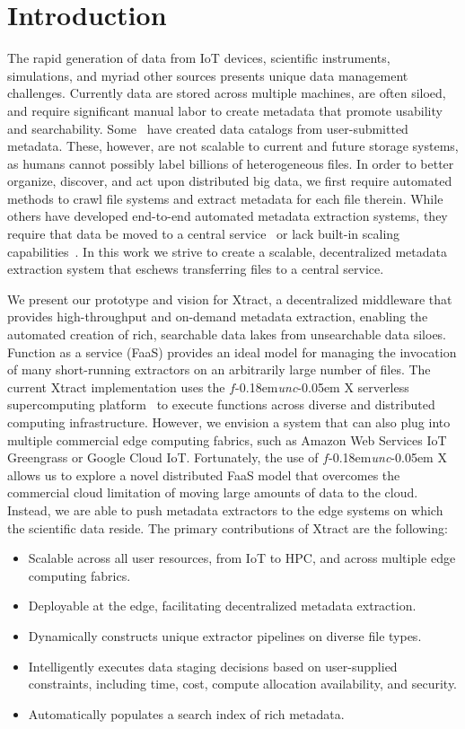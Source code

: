 \documentclass[sigconf, 9pt]{acmart}
\newcommand{\name}{Xtract}
\newcommand{\funcx}{$f$\kern-0.18em\emph{unc}\kern-0.05em X}
\begin{document}
\section{Introduction}

The rapid generation of data from IoT devices, scientific instruments, simulations, and myriad other sources presents unique 
data management challenges. Currently data are stored across multiple machines, are often siloed, and require 
significant manual labor to create metadata that promote usability and searchability. 
Some~\cite{egan2003vizier, dataverse}  have created data catalogs from user-submitted metadata. These, however, are not scalable to current and future storage systems,
as humans cannot possibly label billions of heterogeneous files.   
In order to better organize, discover, and act upon distributed big data, 
we first require automated methods to crawl file systems and extract 
metadata for each file therein. 
While others have developed end-to-end automated metadata extraction systems, 
they require that data be moved to a central service~\cite{skluzacek2018skluma, skluzacek2016klimatic, padhy2015brown, rodrigo2018sciencesearch} or lack built-in scaling capabilities~\cite{mattmann2011tika}. 
In this work we strive to create a scalable, decentralized metadata extraction system that eschews transferring files to a central service.

We present our prototype and vision for \name{},
a decentralized middleware that provides high-throughput and on-demand metadata 
extraction, enabling the automated creation of rich, searchable data lakes from unsearchable data siloes. 
Function as a service (FaaS)
provides an ideal model for managing the invocation of
many short-running extractors on an arbitrarily large number of files. 
The current \name{} implementation uses the \funcx{} serverless supercomputing platform~\cite{chard2019serverless}
to execute functions across diverse and distributed computing infrastructure.  However, we envision a system that can 
also plug into multiple commercial edge computing fabrics, such as Amazon Web Services IoT Greengrass or Google Cloud IoT. 
Fortunately, the use of \funcx{} allows us to explore a novel distributed FaaS model 
that overcomes the commercial cloud limitation of moving large amounts of data to the cloud. 
Instead, we are able to push
metadata extractors to the edge systems on which the scientific data reside. 
The primary contributions of \name{} are the following: 
\begin{itemize}
\item Scalable across all user resources, from IoT to HPC, and across multiple edge computing fabrics. 
\item Deployable at the edge, facilitating decentralized metadata extraction.
\item Dynamically constructs unique extractor pipelines on diverse file types. 
\item Intelligently executes data staging decisions based on user-supplied constraints, including time, cost, compute allocation availability, and security. 
\item Automatically populates a search index of rich metadata. 
\end{itemize}
\end{document}
